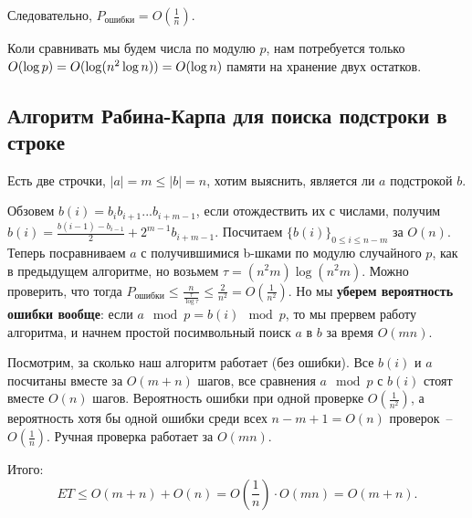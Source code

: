 Следовательно, $P_\text{ошибки} = O(\frac{1}{n})$.

Коли сравнивать мы будем числа по модулю $p$, нам потребуется только $O(\log p) = \\ O(\log(n^2\log n)) = O(\log n)$ памяти на хранение двух остатков.

\subsection{Алгоритм Рабина-Карпа для поиска подстроки в строке}

Есть две строчки, $|a|=m\le|b|=n$, хотим выяснить, является ли $a$ подстрокой $b$.

Обзовем $b(i)=b_i b_{i+1}...b_{i+m-1}$, если отождествить их с числами, получим $b(i)=\frac{b(i-1)-b_{i-1}}{2}+2^{m-1} b_{i+m-1}$. Посчитаем $\{b(i)\}_{0\le i\le n-m}$ за $O(n)$. Теперь посравниваем $a$ с получившимися b-шками по модулю случайного $p$, как в предыдущем алгоритме, но возьмем $\tau=(n^2m)\log(n^2m)$. Можно проверить, что тогда $P_{\text{ошибки}}\le\frac{n}{\frac{\tau}{\log\tau}}\le\frac{2}{n^2}=O(\frac{1}{n^2})$. Но мы \textbf{уберем вероятность ошибки вообще}: если $a\mod{p}=b(i)\mod{p}$, то мы прервем работу алгоритма, и начнем простой посимвольный поиск $a$ в $b$ за время $O(mn)$.

Посмотрим, за сколько наш алгоритм работает (без ошибки). Все $b(i)$ и $a$ посчитаны вместе за $O(m+n)$ шагов, все сравнения $a \mod{p}$ с $b(i)$ стоят вместе $O(n)$ шагов. Вероятность ошибки при одной проверке $O(\frac{1}{n^2})$, а вероятность хотя бы одной ошибки среди всех $n-m+1 = O(n)$ проверок~-- $O(\frac{1}{n})$. Ручная проверка работает за $O(mn)$. 

Итого: $$ET\le O(m+n) + O(n) = O(\frac{1}{n})\cdot O(mn) = O(m+n).$$
